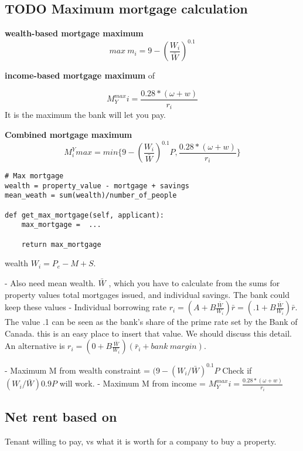 \subsection{TODO Maximum mortgage calculation}

\textbf{wealth-based  mortgage maximum} 
 \[max\ m_i = 9-\left(\frac{W_i}{\bar W}\right)^{0.1} \]


\textbf{income-based  mortgage maximum} of 

\[M^{max}_Yi = \frac{0.28*(\omega+w)}{r_i}\] It is the maximum the bank will let you pay.

\textbf{Combined  mortgage maximum}
\[ M_i^Y{max} = min \{9-\left(\frac{W_i}{\bar W}\right)^{0.1}P,  \frac{0.28*(\omega+w)}{r_i} \}\]

\begin{lstlisting}
# Max mortgage
wealth = property_value - mortgage + savings
mean_weath = sum(wealth)/number_of_people

def get_max_mortgage(self, applicant):
    max_mortgage =  ...
    
    return max_mortgage
\end{lstlisting}

wealth $W_i = P_e-M+S$.  

- Also need mean wealth. $\bar W$ , which you have to calculate from the sums for property values total mortgages issued, and individual savings. The bank could keep these values
- Individual borrowing rate 
$r_i = (A + B \frac{\bar{W}}{W_i})\bar r=(.1 + B \frac{\bar{W}}{W_i})\bar r$.
The value .1 can be seen as the bank's share of the prime rate set by the Bank of Canada. this is an easy place to insert that value. We should discuss this detail. An alternative is
$r_i = (0 + B \frac{\bar{W}}{W_i})(\bar r_i+ bank\ margin)$.

- Maximum M  from wealth constraint = $(9-(W_i/\bar W)^{0.1}P$
  Check if $(W_i/\bar W)0.9P$ will work. 
- Maximum M  from income = $M^{max}_Yi = \frac{0.28*(\omega+w)}{r_i}$ 


 
\subsection{Net rent based on}
Tenant willing to pay, vs what it is worth for a company to buy a property.

